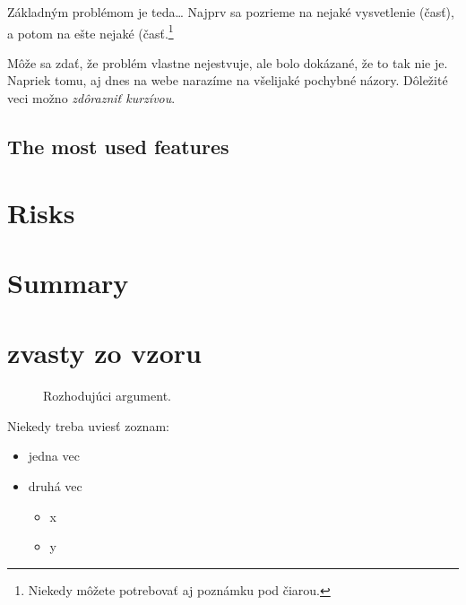 \documentclass[10pt,twoside,english,a4paper]{article}
\begin{document}
Základným problémom je teda\ldots{} Najprv sa pozrieme na nejaké vysvetlenie (časť), a potom na ešte nejaké (časť.\footnote{Niekedy môžete potrebovať aj poznámku pod čiarou.}

Môže sa zdať, že problém vlastne nejestvuje, ale bolo dokázané, že to tak nie je. Napriek tomu, aj dnes na webe narazíme na všelijaké pochybné názory. Dôležité veci možno \emph{zdôrazniť kurzívou}.


\subsection{The most used features} \label{benefits:features}

%
%
%

\section{Risks} \label{risks}

%
%
%

\section{Summary} \label{summary} %

%
%
%

\section{zvasty zo vzoru}\label{zvasty}

\begin{figure*}[tbh]
\centering
\caption{Rozhodujúci argument.}
\label{f:rozhod}
\end{figure*}


 Niekedy treba uviesť zoznam:

\begin{itemize}
\item jedna vec
\item druhá vec
	\begin{itemize}
	\item x
	\item y
	\end{itemize}
\end{itemize}
\end{document}
